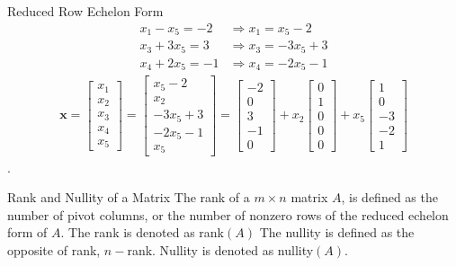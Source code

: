 \begin{example}{Reduced Row Echelon Form}
	\begin{align*}
		x_1-x_5 =-2   &\Rightarrow x_1=x_5 -2\\
        x_3 + 3x_5 =3 &\Rightarrow x_3=-3x_5+3\\
        x_4 +2x_5 = -1 &\Rightarrow	x_4=-2x_5-1
	\end{align*}
    \begin{align*}
    	\textbf{x}=
        \begin{bmatrix}
       	    x_1\\ x_2 \\ x_3\\ x_4 \\x_5
        \end{bmatrix} =
        \begin{bmatrix}
        	x_5- 2\\ x_2\\ -3x_5 +3\\-2x_5-1\\ x_5 
        \end{bmatrix}=
        \begin{bmatrix}
      	    -2\\ 0 \\ 3 \\-1 \\0
        \end{bmatrix} + x_2
        \begin{bmatrix}
            0 \\ 1 \\ 0 \\ 0 \\ 0 
        \end{bmatrix} + x_5
        \begin{bmatrix}
            1 \\ 0 \\ -3 \\ -2 \\ 1
        \end{bmatrix}
    \end{align*}.
\end{example}

\begin{definition}{Rank and Nullity of a Matrix}
The rank of a $m \times n$ matrix $A$, is defined as the number of pivot columns, or the number of nonzero rows of the reduced echelon form of $A$. The rank is denoted as rank$(A)$
The nullity is defined as the opposite of rank, $n - $rank. Nullity is denoted as nullity$(A)$.
\cite[47]{LiAl}
\end{definition}

